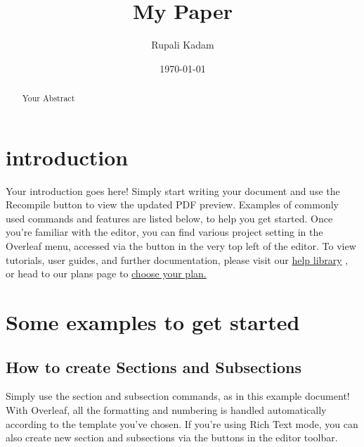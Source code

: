 \documentclass{article}
\title{My Paper}
\author{Rupali Kadam}
\date{\today}
\begin{document}
	\maketitle
	\begin{abstract}
		Your Abstract
	\end{abstract}
	\section{introduction}
	Your introduction goes here! Simply start writing your document and use the Recompile button to
	view the updated PDF preview. Examples of commonly used commands and features are listed below,
	to help you get started.
	Once you’re familiar with the editor, you can find various project setting in the Overleaf menu,
	accessed via the button in the very top left of the editor. To view tutorials, user guides, and further
	documentation, please visit our \href{https://www.overleaf.com/learn}{help library} , or head to our plans page to \href{https://www.overleaf.com/user/subscription/plans}{choose your plan.} 
	\section{Some examples to get started}
	  \subsection{How to create Sections and Subsections}
	  Simply use the section and subsection commands, as in this example document! With Overleaf, all
	  the formatting and numbering is handled automatically according to the template you’ve chosen. If
	  you’re using Rich Text mode, you can also create new section and subsections via the buttons in the
	  editor toolbar.
\end{document}
